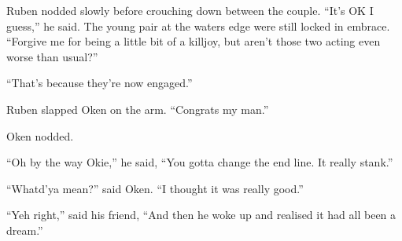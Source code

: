 Ruben nodded slowly before crouching down between the couple.  ``It's OK I guess,'' he said.  The young pair at the waters edge were still locked in embrace.  ``Forgive me for being a little bit of a killjoy, but aren't those two acting even worse than usual?''

``That's because they're now engaged.''  

Ruben slapped Oken on the arm.  ``Congrats my man.''

Oken nodded.

``Oh by the way Okie,'' he said, ``You gotta change the end line.  It really stank.''

``Whatd'ya mean?'' said Oken.  ``I thought it was really good.''

``Yeh right,'' said his friend, ``And then he woke up and realised it had all been a dream.''

